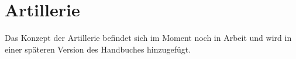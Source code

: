 \section{Artillerie}
Das Konzept der Artillerie befindet sich im Moment noch in Arbeit und wird in einer späteren Version des Handbuches hinzugefügt.
